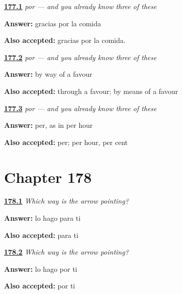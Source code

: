 \noindent\begin{minipage}[t]{\linewidth}
\raggedright
\hyperlink{review-ES-C51-por-thanks}{\textbf{177.1}} \emph{por — and you already know three of these}\par
\small \textbf{Answer:} gracias por la comida\par
\footnotesize \textbf{Also accepted:} gracias por la comida.
\end{minipage}\par\medskip

\noindent\begin{minipage}[t]{\linewidth}
\raggedright
\hyperlink{review-ES-C51-por-favor}{\textbf{177.2}} \emph{por — and you already know three of these}\par
\small \textbf{Answer:} by way of a favour\par
\footnotesize \textbf{Also accepted:} through a favour; by means of a favour
\end{minipage}\par\medskip

\noindent\begin{minipage}[t]{\linewidth}
\raggedright
\hyperlink{review-ES-C51-por-per}{\textbf{177.3}} \emph{por — and you already know three of these}\par
\small \textbf{Answer:} per, as in per hour\par
\footnotesize \textbf{Also accepted:} per; per hour, per cent
\end{minipage}\par\medskip

\section*{Chapter 178}

\noindent\begin{minipage}[t]{\linewidth}
\raggedright
\hyperlink{review-ES-C51-la-flecha-gift}{\textbf{178.1}} \emph{Which way is the arrow pointing?}\par
\small \textbf{Answer:} lo hago para ti\par
\footnotesize \textbf{Also accepted:} para ti
\end{minipage}\par\medskip

\noindent\begin{minipage}[t]{\linewidth}
\raggedright
\hyperlink{review-ES-C51-la-flecha-cause}{\textbf{178.2}} \emph{Which way is the arrow pointing?}\par
\small \textbf{Answer:} lo hago por ti\par
\footnotesize \textbf{Also accepted:} por ti
\end{minipage}\par\medskip


